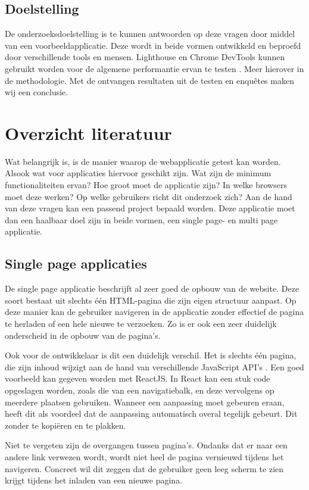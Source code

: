 \documentclass{hogent-article}
\begin{document}
\subsection{Doelstelling}
De onderzoeksdoelstelling is te kunnen antwoorden op deze vragen door middel van een voorbeeldapplicatie.
Deze wordt in beide vormen ontwikkeld en beproefd door verschillende tools en mensen.
Lighthouse en Chrome DevTools kunnen gebruikt worden voor de algemene performantie ervan te testen \autocite{Demian2022}.
Meer hierover in de methodologie.
Met de ontvangen resultaten uit de testen en enquêtes maken wij een conclusie.


\section{Overzicht literatuur}
Wat belangrijk is, is de manier waarop de webapplicatie getest kan worden.
Alsook wat voor applicaties hiervoor geschikt zijn.
Wat zijn de minimum functionaliteiten ervan?
Hoe groot moet de applicatie zijn?
In welke browsers moet deze werken?
Op welke gebruikers richt dit onderzoek zich?
Aan de hand van deze vragen kan een passend project bepaald worden.
Deze applicatie moet dan een haalbaar doel zijn in beide vormen, een single page- en multi page applicatie.

\subsection{Single page applicaties}
De single page applicatie beschrijft al zeer goed de opbouw van de website.
Deze soort bestaat uit slechts één HTML-pagina die zijn eigen structuur aanpast.
Op deze manier kan de gebruiker navigeren in de applicatie zonder effectief de pagina te herladen of een hele nieuwe te verzoeken.
Zo is er ook een zeer duidelijk onderscheid in de opbouw van de pagina's.

Ook voor de ontwikkelaar is dit een duidelijk verschil.
Het is slechts één pagina, die zijn inhoud wijzigt aan de hand van verschillende JavaScript API's \autocite{MDN2022}.
Een goed voorbeeld kan gegeven worden met ReactJS.
In React kan een stuk code opgeslagen worden, zoals die van een navigatiebalk, en deze vervolgens op meerdere plaatsen gebruiken.
Wanneer een aanpassing moet gebeuren eraan, heeft dit als voordeel dat de aanpassing automatisch overal tegelijk gebeurt.
Dit zonder te kopiëren en te plakken.

Niet te vergeten zijn de overgangen tussen pagina's.
Ondanks dat er naar een andere link verwezen wordt, wordt niet heel de pagina vernieuwd tijdens het navigeren.
Concreet wil dit zeggen dat de gebruiker geen leeg scherm te zien krijgt tijdens het inladen van een nieuwe pagina.
\end{document}
